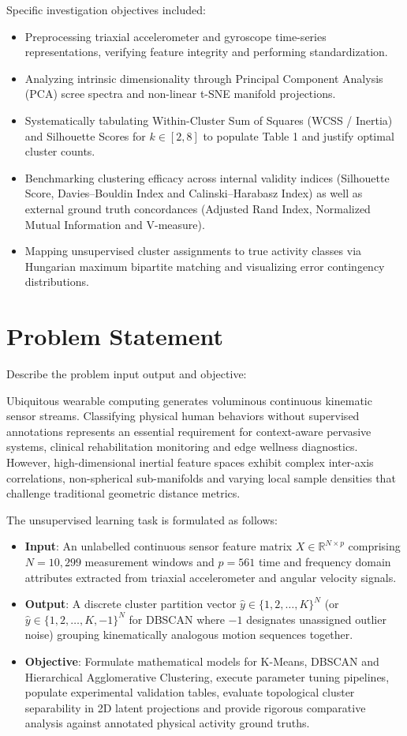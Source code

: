 \documentclass[12pt,a4paper]{article}
\begin{document}
Specific investigation objectives included:
\begin{itemize}
\item Preprocessing triaxial accelerometer and gyroscope time-series representations, verifying feature integrity and performing standardization.
\item Analyzing intrinsic dimensionality through Principal Component Analysis (PCA) scree spectra and non-linear t-SNE manifold projections.
\item Systematically tabulating Within-Cluster Sum of Squares (WCSS / Inertia) and Silhouette Scores for $k \in [2, 8]$ to populate Table 1 and justify optimal cluster counts.
\item Benchmarking clustering efficacy across internal validity indices (Silhouette Score, Davies--Bouldin Index and Calinski--Harabasz Index) as well as external ground truth concordances (Adjusted Rand Index, Normalized Mutual Information and V-measure).
\item Mapping unsupervised cluster assignments to true activity classes via Hungarian maximum bipartite matching and visualizing error contingency distributions.
\end{itemize}

\section{Problem Statement}
Describe the problem input output and objective:

Ubiquitous wearable computing generates voluminous continuous kinematic sensor streams. Classifying physical human behaviors without supervised annotations represents an essential requirement for context-aware pervasive systems, clinical rehabilitation monitoring and edge wellness diagnostics. However, high-dimensional inertial feature spaces exhibit complex inter-axis correlations, non-spherical sub-manifolds and varying local sample densities that challenge traditional geometric distance metrics.

The unsupervised learning task is formulated as follows:
\begin{itemize}
\item \textbf{Input}: An unlabelled continuous sensor feature matrix $X \in \mathbb{R}^{N \times p}$ comprising $N = 10,299$ measurement windows and $p = 561$ time and frequency domain attributes extracted from triaxial accelerometer and angular velocity signals.
\item \textbf{Output}: A discrete cluster partition vector $\hat{y} \in \{1, 2, \dots, K\}^N$ (or $\hat{y} \in \{1, 2, \dots, K, -1\}^N$ for DBSCAN where $-1$ designates unassigned outlier noise) grouping kinematically analogous motion sequences together.
\item \textbf{Objective}: Formulate mathematical models for K-Means, DBSCAN and Hierarchical Agglomerative Clustering, execute parameter tuning pipelines, populate experimental validation tables, evaluate topological cluster separability in 2D latent projections and provide rigorous comparative analysis against annotated physical activity ground truths.
\end{itemize}
\end{document}
